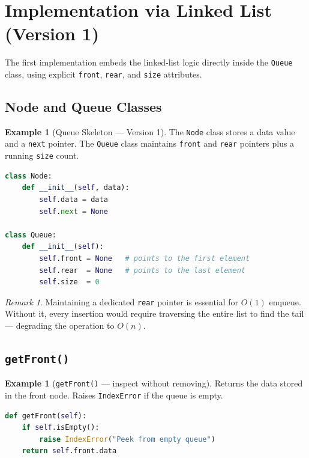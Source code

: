 \documentclass[11pt, a4paper, notitlepage]{report}
\theoremstyle{definition}
\theoremstyle{remark}
\newtheorem{remark}[theorem]{Remark}
\theoremstyle{definition}
\newtheorem{example}[theorem]{Example}
\begin{document}

\section{Implementation via Linked List (Version 1)}
\label{sec:queue-impl-v1}

The first implementation embeds the linked-list logic directly inside the \texttt{Queue} class,
using explicit \texttt{front}, \texttt{rear}, and \texttt{size} attributes.

\subsection{Node and Queue Classes}
\label{subsec:queue-v1-classes}

\begin{example}[Queue Skeleton --- Version 1]
\label{ex:queue-skeleton}
The \texttt{Node} class stores a data value and a \texttt{next} pointer.  The \texttt{Queue}
class maintains \texttt{front} and \texttt{rear} pointers plus a running \texttt{size} count.
\begin{lstlisting}[language=Python]
class Node:
    def __init__(self, data):
        self.data = data
        self.next = None

class Queue:
    def __init__(self):
        self.front = None   # points to the first element
        self.rear  = None   # points to the last element
        self.size  = 0
\end{lstlisting}
\end{example}

\begin{remark}
Maintaining a dedicated \texttt{rear} pointer is essential for $O(1)$ enqueue.  Without it,
every insertion would require traversing the entire list to find the tail --- degrading the
operation to $O(n)$.
\end{remark}

\subsection{\texttt{getFront()}}
\label{subsec:queue-getfront}

\begin{example}[\texttt{getFront()} --- inspect without removing]
\label{ex:queue-getfront}
Returns the data stored in the front node.  Raises \texttt{IndexError} if the queue is empty.
\begin{lstlisting}[language=Python]
def getFront(self):
    if self.isEmpty():
        raise IndexError("Peek from empty queue")
    return self.front.data
\end{lstlisting}
\end{example}
\end{document}
